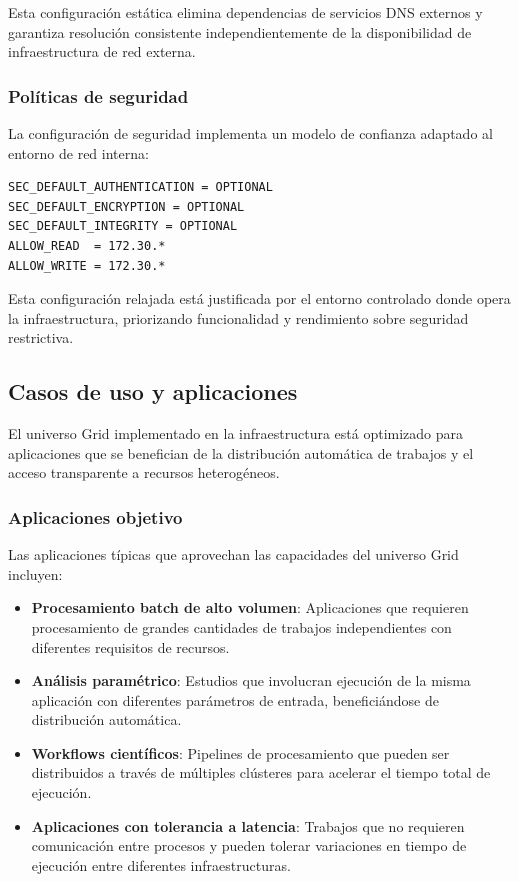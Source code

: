 Esta configuración estática elimina dependencias de servicios DNS externos y garantiza resolución consistente independientemente de la disponibilidad de infraestructura de red externa.

\subsubsection{Políticas de seguridad}
\noindent

La configuración de seguridad implementa un modelo de confianza adaptado al entorno de red interna:

\begin{verbatim}
SEC_DEFAULT_AUTHENTICATION = OPTIONAL
SEC_DEFAULT_ENCRYPTION = OPTIONAL
SEC_DEFAULT_INTEGRITY = OPTIONAL
ALLOW_READ  = 172.30.*
ALLOW_WRITE = 172.30.*
\end{verbatim}

Esta configuración relajada está justificada por el entorno controlado donde opera la infraestructura, priorizando funcionalidad y rendimiento sobre seguridad restrictiva.

\subsection{Casos de uso y aplicaciones}
\noindent

El universo Grid implementado en la infraestructura \GRID está optimizado para aplicaciones que se benefician de la distribución automática de trabajos y el acceso transparente a recursos heterogéneos.

\subsubsection{Aplicaciones objetivo}
\noindent

Las aplicaciones típicas que aprovechan las capacidades del universo Grid incluyen:

\begin{itemize}
	\item \textbf{Procesamiento batch de alto volumen}: Aplicaciones que requieren procesamiento de grandes cantidades de trabajos independientes con diferentes requisitos de recursos.

	\item \textbf{Análisis paramétrico}: Estudios que involucran ejecución de la misma aplicación con diferentes parámetros de entrada, beneficiándose de distribución automática.

	\item \textbf{Workflows científicos}: Pipelines de procesamiento que pueden ser distribuidos a través de múltiples clústeres para acelerar el tiempo total de ejecución.

	\item \textbf{Aplicaciones con tolerancia a latencia}: Trabajos que no requieren comunicación entre procesos y pueden tolerar variaciones en tiempo de ejecución entre diferentes infraestructuras.
\end{itemize}

